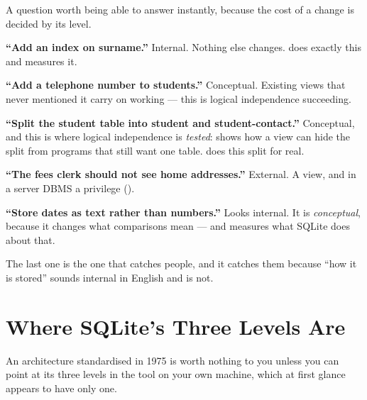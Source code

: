 \begin{conceptbox}
A question worth being able to answer instantly, because the cost of a change
is decided by its level.

\begin{tight}
  \item \textbf{``Add an index on surname.''} Internal. Nothing else changes.
         does exactly this and measures it.
  \item \textbf{``Add a telephone number to students.''} Conceptual. Existing
        views that never mentioned it carry on working --- this is logical
        independence succeeding.
  \item \textbf{``Split the student table into student and student-contact.''}
        Conceptual, and this is where logical independence is \emph{tested}:
         shows how a view can hide the split from programs that
        still want one table.  does this split for real.
  \item \textbf{``The fees clerk should not see home addresses.''} External. A
        view, and in a server DBMS a privilege ().
  \item \textbf{``Store dates as text rather than numbers.''} Looks internal.
        It is \emph{conceptual}, because it changes what comparisons mean ---
        and  measures what SQLite does about that.
\end{tight}

\smallskip
The last one is the one that catches people, and it catches them because
``how it is stored'' sounds internal in English and is not.
\end{conceptbox}

\section{Where SQLite's Three Levels Are}

An architecture standardised in 1975 is worth nothing to you unless you can
point at its three levels in the tool on your own machine, which at first
glance appears to have only one.

